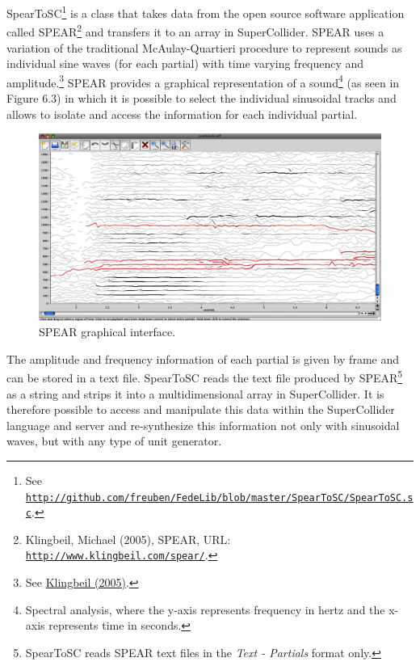SpearToSC\footnote{See \href{http://github.com/freuben/FedeLib/blob/master/SpearToSC/SpearToSC.sc}{\texttt{http://github.com/freuben/FedeLib/blob/master/SpearToSC/SpearToSC.sc}}.} is a class that takes data from the open source software application called SPEAR\footnote{Klingbeil, Michael (2005), SPEAR, URL: \href{http://www.klingbeil.com/spear/}{\texttt{http://www.klingbeil.com/spear/}}.} and transfers it to an array in SuperCollider. SPEAR uses a variation of the traditional McAulay-Quartieri procedure to represent sounds as individual sine waves (for each partial) with time varying frequency and amplitude.\footnote{See \hyperlink{klingbeil}{Klingbeil (2005)}.} SPEAR provides a graphical representation of a sound\footnote{Spectral analysis, where the y-axis represents frequency in hertz and the x-axis represents time in seconds.} (as seen in Figure 6.3) in which it is possible to select the individual sinusoidal tracks and allows to isolate and access the information for each individual partial. 
\begin{figure}[htbp] %
   \centering
   \includegraphics[width=15cm]{Chapter6/Spear1.tif} %
   \caption{SPEAR graphical interface.}
   \label{fig:example}
\end{figure}
The amplitude and frequency information of each partial is given by frame and can be stored in a text file. SpearToSC reads the text file produced by SPEAR\footnote{SpearToSC reads SPEAR text files in the \emph{Text - Partials} format only.} as a string and strips it into a multidimensional array in SuperCollider. It is therefore possible to access and manipulate this data within the SuperCollider language and server and re-synthesize this information not only with sinusoidal waves, but with any type of unit generator. 

